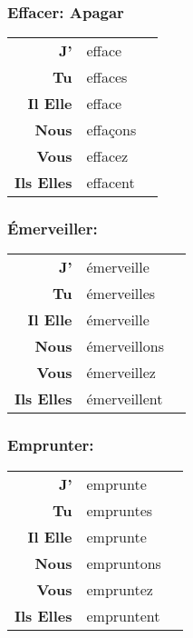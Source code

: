\documentclass{subfiles}
\begin{document}
\begin{multicols*}{3}
        \subsubsection{Effacer: Apagar}
            \begin{tabular}{r l r}
                \textbf{J'}        & efface   &\\
                \textbf{Tu}        & effaces  &\\
                \textbf{Il Elle}   & efface   &\\
                \textbf{Nous}      & effaçons &\\
                \textbf{Vous}      & effacez  &\\
                \textbf{Ils Elles} & effacent &
            \end{tabular}

        \subsubsection{Émerveiller:}
            \begin{tabular}{r l r}
                \textbf{J'}        & émerveille   &\\
                \textbf{Tu}        & émerveilles  &\\
                \textbf{Il Elle}   & émerveille   &\\
                \textbf{Nous}      & émerveillons &\\
                \textbf{Vous}      & émerveillez  &\\
                \textbf{Ils Elles} & émerveillent &
            \end{tabular} 

        \subsubsection{Emprunter: }
            \begin{tabular}{r l r}
                \textbf{J'}        & emprunte   &\\
                \textbf{Tu}        & empruntes  &\\
                \textbf{Il Elle}   & emprunte   &\\
                \textbf{Nous}      & empruntons &\\
                \textbf{Vous}      & empruntez  &\\
                \textbf{Ils Elles} & empruntent &
            \end{tabular}


\end{multicols*}
\end{document}
